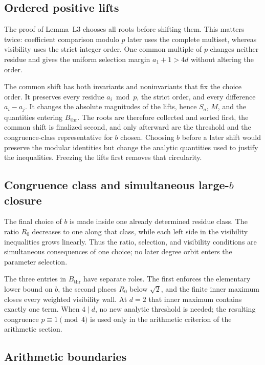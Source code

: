 \documentclass[11pt,letterpaper]{article}
\theoremstyle{plain}
\begin{document}
\subsection{Ordered positive lifts}

The proof of Lemma~L3 chooses all roots before shifting them.  This matters twice: coefficient comparison modulo $p$ later uses the complete multiset, whereas visibility uses the strict integer order.  One common multiple of $p$ changes neither residue and gives the uniform selection margin $a_1+1>4d$ without altering the order.

The common shift has both invariants and noninvariants that fix the choice order.  It preserves every residue $a_i\bmod p$, the strict order, and every difference $a_i-a_j$.  It changes the absolute magnitudes of the lifts, hence $S_a$, $M$, and the quantities entering $B_{\mathrm{thr}}$.  The roots are therefore collected and sorted first, the common shift is finalized second, and only afterward are the threshold and the congruence-class representative for $b$ chosen.  Choosing $b$ before a later shift would preserve the modular identities but change the analytic quantities used to justify the inequalities.  Freezing the lifts first removes that circularity.

\subsection{Congruence class and simultaneous \texorpdfstring{large-$b$}{large-b} closure}

The final choice of $b$ is made inside one already determined residue class.  The ratio $R_0$ decreases to one along that class, while each left side in the visibility inequalities grows linearly.  Thus the ratio, selection, and visibility conditions are simultaneous consequences of one choice; no later degree orbit enters the parameter selection.

The three entries in $B_{\mathrm{thr}}$ have separate roles.  The first enforces the elementary lower bound on $b$, the second places $R_0$ below $\sqrt{2}$, and the finite inner maximum closes every weighted visibility wall.  At $d=2$ that inner maximum contains exactly one term.  When $4\mid d$, no new analytic threshold is needed; the resulting congruence $p\equiv1\pmod4$ is used only in the arithmetic criterion of the arithmetic section.

\subsection{Arithmetic boundaries}
\end{document}
